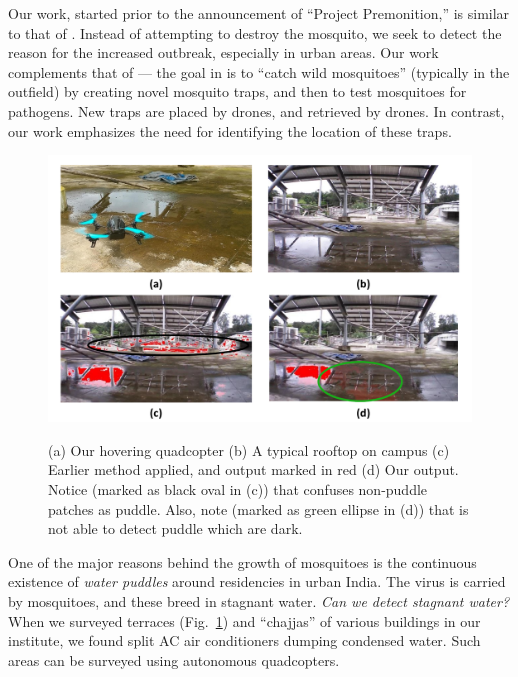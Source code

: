 \documentclass[11pt]{article}
\begin{document}
Our work, started prior to the announcement of ``Project
Premonition,'' is similar to that of \cite{Microsoft15}.  Instead of
attempting to destroy the mosquito, we seek to detect the reason for
the increased outbreak, especially in urban areas.  Our work complements that
of \cite{Microsoft15} --- the goal in \cite{Microsoft15} is to ``catch wild
mosquitoes'' (typically in the outfield) by creating novel mosquito traps, and
then to test mosquitoes for pathogens. New traps are placed by drones, and
retrieved by drones. In contrast, our work emphasizes the need for
identifying the location of these traps.  

\begin{figure}[h!]
\centering
\includegraphics[width=\linewidth]{stagnantWater/figures/teaser.pdf}
\label{teaser} \caption{(a) Our hovering quadcopter (b) A typical
  rooftop on campus (c) Earlier method \cite{rankin2004daytime} applied, and
  output marked in red (d) Our output. Notice (marked as black oval in
  (c)) that \cite{rankin2004daytime} confuses non-puddle patches as puddle.
  Also, note (marked as green ellipse in (d)) that \cite{rankin2004daytime} is
  not able to detect puddle which are dark.}
\end{figure}

One of the major reasons behind the growth of mosquitoes is the
continuous existence of \emph{water puddles} around residencies in
urban India.  The virus is carried by mosquitoes, and these breed in
stagnant water. \emph{Can we detect stagnant water?}  When we surveyed
terraces (Fig.~\ref{teaser}) and ``chajjas'' of various buildings in
our institute, we found split AC air conditioners dumping condensed
water. Such areas can be surveyed using autonomous quadcopters.
\end{document}
